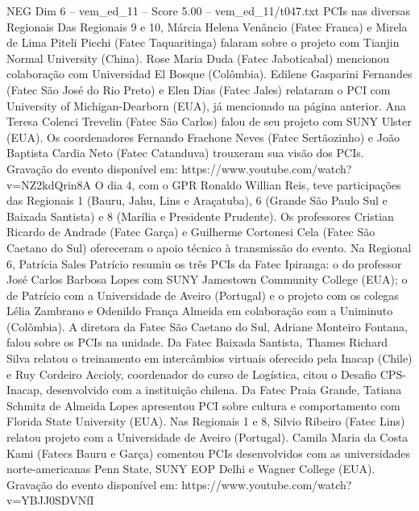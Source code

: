 \begin{textsample}{NEG Dim 6 – vem\_ed\_11 – Score 5.00 – vem\_ed\_11/t047.txt}  \label{ex:f6_neg_075}
PCIs nas diversas Regionais Das Regionais 9 e 10, Márcia Helena Venâncio (Fatec Franca) e Mirela de Lima Piteli Picchi (Fatec Taquaritinga) falaram sobre o projeto com Tianjin Normal University (China).
Rose Maria Duda (Fatec Jaboticabal) mencionou colaboração com Universidad El Bosque (Colômbia).
Edilene Gasparini Fernandes (Fatec São José do Rio Preto) e Elen Dias (Fatec Jales) relataram o PCI com University of Michigan-Dearborn (EUA), já mencionado na página anterior.
Ana Teresa Colenci Trevelin (Fatec São Carlos) falou de seu projeto com SUNY Ulster (EUA).
Os coordenadores Fernando Frachone Neves (Fatec Sertãozinho) e João Baptista Cardia Neto (Fatec Catanduva) trouxeram sua visão dos PCIs.
Gravação do evento disponível em: https://www.youtube.com/watch?v=NZ2kdQrin8A O dia 4, com o GPR Ronaldo Willian Reis, teve participações das Regionais 1 (Bauru, Jahu, Lins e Araçatuba), 6 (Grande São Paulo Sul e Baixada Santista) e 8 (Marília e Presidente Prudente).
Os professores Cristian Ricardo de Andrade (Fatec Garça) e Guilherme Cortonesi Cela (Fatec São Caetano do Sul) ofereceram o apoio técnico à transmissão do evento.
Na Regional 6, Patrícia Sales Patrício resumiu os três PCIs da Fatec Ipiranga: o do professor José Carlos Barbosa Lopes com SUNY Jamestown Community College (EUA); o de Patrício com a Universidade de Aveiro (Portugal) e o projeto com os colegas Lélia Zambrano e Odenildo França Almeida em colaboração com a Uniminuto (Colômbia).
A diretora da Fatec São Caetano do Sul, Adriane Monteiro Fontana, falou sobre os PCIs na unidade.
Da Fatec Baixada Santista, Thames Richard Silva relatou o treinamento em intercâmbios virtuais oferecido pela Inacap (Chile) e Ruy Cordeiro Accioly, coordenador do curso de Logística, citou o Desafio CPS-Inacap, desenvolvido com a instituição chilena.
Da Fatec Praia Grande, Tatiana Schmitz de Almeida Lopes apresentou PCI sobre cultura e comportamento com Florida State University (EUA).
Nas Regionais 1 e 8, Silvio Ribeiro (Fatec Lins) relatou projeto com a Universidade de Aveiro (Portugal).
Camila Maria da Costa Kami (Fatecs Bauru e Garça) comentou PCIs desenvolvidos com as universidades norte-americanas Penn State, SUNY EOP Delhi e Wagner College (EUA).
Gravação do evento disponível em: https://www.youtube.com/watch?v=YBJJ0SDVNfI

\end{textsample}
